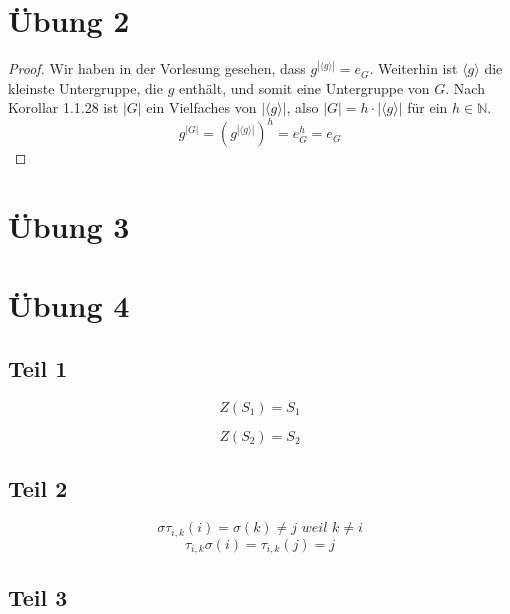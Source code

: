 \documentclass[10pt,a4paper]{article}
\begin{document}
\section{Übung 2}

\begin{proof}
  Wir haben in der Vorlesung gesehen, dass $g^{|\langle g \rangle|} = e_{G}$.
  Weiterhin ist $\langle g \rangle$ die kleinste Untergruppe, die $g$ enthält, und somit eine Untergruppe von $G$.
  Nach Korollar 1.1.28 ist $|G|$ ein Vielfaches von $|\langle g \rangle|$, also $|G| = h \cdot |\langle g \rangle|$ für ein $h \in \mathbb{N}$.
  \begin{equation}
    g^{|G|} = (g^{|\langle g \rangle|})^{h} = e_{G}^{h} = e_{G}
  \end{equation}
\end{proof}

\section{Übung 3}

\section{Übung 4}

\subsection{Teil 1}

\begin{equation}
  Z(S_{1}) = S_{1}
\end{equation}

\begin{equation}
  Z(S_{2}) = S_{2}
\end{equation}

\subsection{Teil 2}

\begin{equation}
  \sigma \tau_{i, k}(i) = \sigma(k) \ne j \textit{ weil $k \ne i$}
\end{equation}
\begin{equation}
  \tau_{i, k} \sigma(i) = \tau_{i, k}(j) = j
\end{equation}

\subsection{Teil 3}
\end{document}
